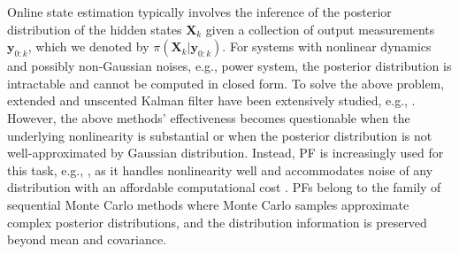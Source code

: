 Online state estimation typically involves the inference of the posterior distribution of the hidden states $\boldsymbol{X}_k$ given a collection of output measurements $\boldsymbol{y}_{0:k}$, which we denoted by $\pi(\boldsymbol{X}_k | \boldsymbol{y}_{0:k})$. 
For systems with nonlinear dynamics and possibly non-Gaussian noises, e.g., power system, the posterior distribution is intractable and cannot be computed in closed form.
To solve the above problem, extended and unscented Kalman filter have been extensively studied, e.g., \cite{Zhao2017,Wang2012}. However, the above methods' effectiveness becomes questionable when the underlying nonlinearity is substantial or when the posterior distribution is not well-approximated by Gaussian distribution. Instead, PF is increasingly used for this task, e.g., \cite{Cui2015}, as it handles nonlinearity well and accommodates noise of any distribution with an affordable computational cost \cite{Kadirkamanathan2002,cappe2007overview}. PFs belong to the family of sequential Monte Carlo methods where Monte Carlo samples approximate complex posterior distributions, and the distribution information is preserved beyond mean and covariance. 

